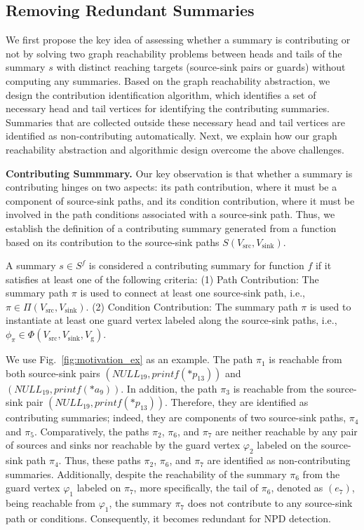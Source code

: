 \subsection{Removing Redundant Summaries}

We first propose the key idea of assessing whether a summary is contributing or not by solving two graph reachability problems between heads and tails of the summary $s$ with distinct reaching targets (source-sink pairs or guards) without computing any summaries.
Based on the graph reachability abstraction, we design the contribution identification algorithm, which identifies a set of necessary head and tail vertices for identifying the contributing summaries. 
Summaries that are collected outside these necessary head and tail vertices are identified as non-contributing automatically.
Next, we explain how our graph reachability abstraction and algorithmic design overcome the above challenges.

\textbf{Contributing Summmary.}
Our key observation is that whether a summary is contributing hinges on two aspects: its path contribution, where it must be a component of source-sink paths, and its condition contribution, where it must be involved in the path conditions associated with a source-sink path.
Thus, we establish the definition of a contributing summary generated from a function based on its contribution to the source-sink paths $S(V_{\text{src}}, V_{\text{sink}})$.

\begin{definition} \label{def:contributing_summary}
A summary $s \in S^f$ is considered a contributing summary for function $f$ if it satisfies at least one of the following criteria:
(1) Path Contribution: The summary path $\pi$ is used to connect at least one source-sink path, i.e., $\pi \in \Pi(V_{\text{src}}, V_{\text{sink}})$.
(2) Condition Contribution: The summary path $\pi$ is used to instantiate at least one guard vertex labeled along the source-sink paths, i.e., $\phi_{\pi} \in \Phi(V_{\text{src}}, V_{\text{sink}}, V_{\text{g}})$.
\end{definition}

We use Fig.~\ref{fig:motivation_ex} as an example.
The path $\pi_{1}$ is reachable from both source-sink pairs $(NULL_{19}, printf(*p_{13}))$ and $(NULL_{19}, printf(*a_9))$.
In addition, the path $\pi_3$ is reachable from the source-sink pair $(NULL_{19}, printf(*p_{13}))$.
Therefore, they are identified as contributing summaries; indeed, they are components of two source-sink paths, $\pi_4$ and $\pi_5$.
Comparatively, the paths $\pi_{2}$, $\pi_{6}$, and $\pi_{7}$ are neither reachable by any pair of sources and sinks nor reachable by the guard vertex $\varphi_2$ labeled on the source-sink path $\pi_4$. 
Thus, these paths $\pi_{2}$, $\pi_{6}$, and $\pi_{7}$ are identified as non-contributing summaries.
Additionally, despite the reachability of the summary $\pi_{6}$ from the guard vertex $\varphi_1$ labeled on $\pi_7$, more specifically, the tail of $\pi_{6}$, denoted as $(e_7)$, being reachable from $\varphi_1$, the summary $\pi_{7}$ does not contribute to any source-sink path or conditions. 
Consequently, it becomes redundant for NPD detection.

